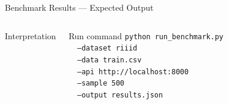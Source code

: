\documentclass[aspectratio=169,12pt]{beamer}
\begin{document}
\begin{frame}{Benchmark Results — Expected Output}
\begin{columns}
\begin{alertblock}{Interpretation}
      \end{alertblock}
      \vspace{6pt}
      \begin{block}{Run command}
        \scriptsize
        \texttt{python run\_benchmark.py}\\
        \texttt{\ \ --dataset riiid}\\
        \texttt{\ \ --data train.csv}\\
        \texttt{\ \ --api http://localhost:8000}\\
        \texttt{\ \ --sample 500}\\
        \texttt{\ \ --output results.json}
      \end{block}
  \end{columns}
\end{frame}
\end{document}
